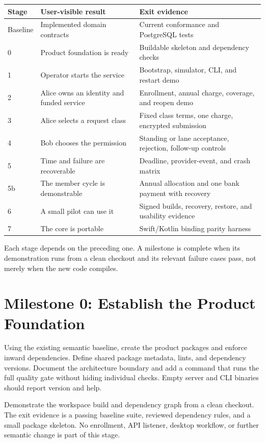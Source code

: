 \documentclass[11pt]{article}
\begin{document}
\begin{center}
\small
\begin{tabularx}{\textwidth}{@{}L{0.09\textwidth}L{0.29\textwidth}Y@{}}
\toprule
Stage & User-visible result & Exit evidence \\
\midrule
Baseline & Implemented domain contracts & Current conformance and PostgreSQL tests \\
0 & Product foundation is ready & Buildable skeleton and dependency checks \\
1 & Operator starts the service & Bootstrap, simulator, CLI, and restart demo \\
2 & Alice owns an identity and funded service & Enrollment, annual charge, coverage, and reopen demo \\
3 & Alice selects a request class & Fixed class terms, one charge, encrypted submission \\
4 & Bob chooses the permission & Standing or lane acceptance, rejection, follow-up controls \\
5 & Time and failure are recoverable & Deadline, provider-event, and crash matrix \\
5b & The member cycle is demonstrable & Annual allocation and one bank payment with recovery \\
6 & A small pilot can use it & Signed builds, recovery, restore, and usability evidence \\
7 & The core is portable & Swift/Kotlin binding parity harness \\
\bottomrule
\end{tabularx}
\end{center}

Each stage depends on the preceding one. A milestone is complete when its
demonstration runs from a clean checkout and its relevant failure cases pass,
not merely when the new code compiles.

\section{Milestone 0: Establish the Product Foundation}

Using the existing semantic baseline, create the product packages and enforce inward
dependencies. Define shared package metadata, lints, and dependency versions.
Document the architecture boundary and add a command that runs the full quality
gate without hiding individual checks. Empty server and CLI binaries should
report version and help.

Demonstrate the workspace build and dependency graph from a clean checkout.
The exit evidence is a passing baseline suite, reviewed dependency rules, and a
small package skeleton. No enrollment, API listener, desktop workflow, or further
semantic change is part of this stage.
\end{document}
